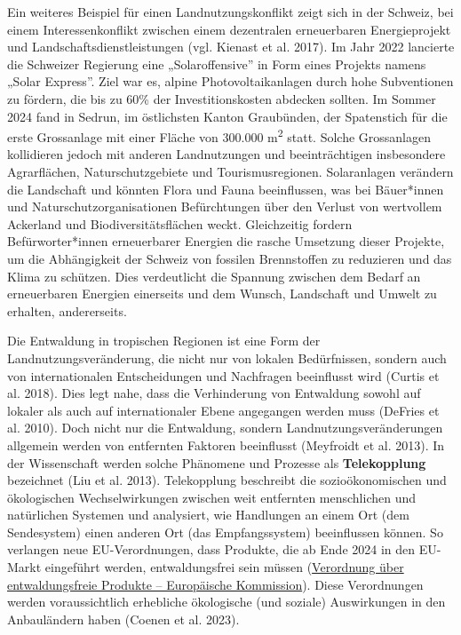 \documentclass[
  nswissgerman,
  a4paper,
  DIV=11,
  numbers=noendperiod,
  oneside,
  openany]{scrreprt}
\begin{document}
\begin{tcolorbox}[enhanced jigsaw, arc=.35mm, bottomrule=.15mm, bottomtitle=1mm, breakable, colback=white, colbacktitle=quarto-callout-tip-color!10!white, colframe=quarto-callout-tip-color-frame, coltitle=black, left=2mm, leftrule=.75mm, opacityback=0, opacitybacktitle=0.6, rightrule=.15mm, title={Landnutzungskonflikte in der Schweiz: der Solar Express}, titlerule=0mm, toprule=.15mm, toptitle=1mm]

Ein weiteres Beispiel für einen Landnutzungskonflikt zeigt sich in der
Schweiz, bei einem Interessenkonflikt zwischen einem dezentralen
erneuerbaren Energieprojekt und Landschaftsdienstleistungen (vgl.
Kienast et al. 2017). Im Jahr 2022 lancierte die Schweizer Regierung
eine „Solaroffensive'' in Form eines Projekts namens „Solar Express''.
Ziel war es, alpine Photovoltaikanlagen durch hohe Subventionen zu
fördern, die bis zu 60\% der Investitionskosten abdecken sollten. Im
Sommer 2024 fand in Sedrun, im östlichsten Kanton Graubünden, der
Spatenstich für die erste Grossanlage mit einer Fläche von 300.000
m\textsuperscript{2} statt. Solche Grossanlagen kollidieren jedoch mit
anderen Landnutzungen und beeinträchtigen insbesondere Agrarflächen,
Naturschutzgebiete und Tourismusregionen. Solaranlagen verändern die
Landschaft und könnten Flora und Fauna beeinflussen, was bei Bäuer*innen
und Naturschutzorganisationen Befürchtungen über den Verlust von
wertvollem Ackerland und Biodiversitätsflächen weckt. Gleichzeitig
fordern Befürworter*innen erneuerbarer Energien die rasche Umsetzung
dieser Projekte, um die Abhängigkeit der Schweiz von fossilen
Brennstoffen zu reduzieren und das Klima zu schützen. Dies verdeutlicht
die Spannung zwischen dem Bedarf an erneuerbaren Energien einerseits und
dem Wunsch, Landschaft und Umwelt zu erhalten, andererseits.

\end{tcolorbox}

Die Entwaldung in tropischen Regionen ist eine Form der
Landnutzungsveränderung, die nicht nur von lokalen Bedürfnissen, sondern
auch von internationalen Entscheidungen und Nachfragen beeinflusst wird
(Curtis et al. 2018). Dies legt nahe, dass die Verhinderung von
Entwaldung sowohl auf lokaler als auch auf internationaler Ebene
angegangen werden muss (DeFries et al. 2010). Doch nicht nur die
Entwaldung, sondern Landnutzungsveränderungen allgemein werden von
entfernten Faktoren beeinflusst (Meyfroidt et al. 2013). In der
Wissenschaft werden solche Phänomene und Prozesse als
\textbf{Telekopplung} bezeichnet ({Liu et al.} 2013). Telekopplung
beschreibt die sozioökonomischen und ökologischen Wechselwirkungen
zwischen weit entfernten menschlichen und natürlichen Systemen und
analysiert, wie Handlungen an einem Ort (dem Sendesystem) einen anderen
Ort (das Empfangssystem) beeinflussen können. So verlangen neue
EU-Verordnungen, dass Produkte, die ab Ende 2024 in den EU-Markt
eingeführt werden, entwaldungsfrei sein müssen
(\href{https://environment.ec.europa.eu/topics/forests/deforestation/regulation-deforestation-free-products_en}{Verordnung
über entwaldungsfreie Produkte -- Europäische Kommission}). Diese
Verordnungen werden voraussichtlich erhebliche ökologische (und soziale)
Auswirkungen in den Anbauländern haben (Coenen et al. 2023).
\end{document}
